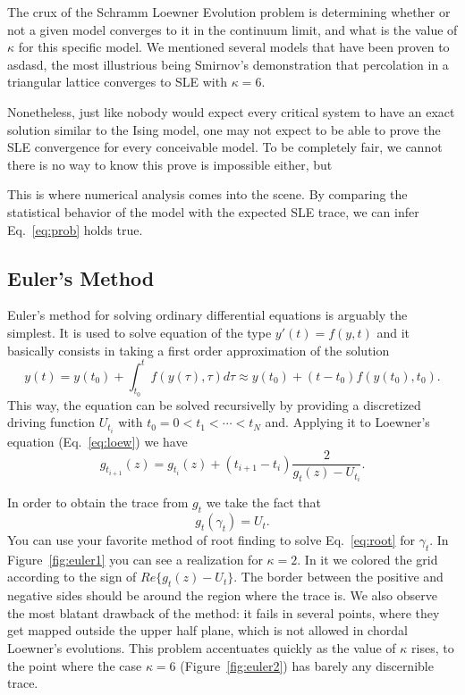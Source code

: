 The crux of the Schramm Loewner Evolution problem is determining whether or not
a given model converges to it in the continuum limit, and what is the value of
$\kappa$ for this specific model. We mentioned several models that have been
proven to asdasd, the most illustrious being Smirnov's demonstration that
percolation in a triangular lattice converges to SLE with $\kappa=6$.

Nonetheless, just like nobody would expect every critical system to have an
exact solution similar to the Ising model, one may not expect to be able to
prove the SLE convergence for every conceivable model. To be completely
fair, we cannot there is no way to know this prove is impossible either, but

This is where
numerical analysis comes into the scene. By comparing the statistical behavior
of the model with the expected SLE trace, we can infer Eq.~\ref{eq:prob} holds
true.

\subsection{Euler's Method}
\label{ss:euler}

Euler's method for solving ordinary differential equations is arguably the
simplest. It is used to solve equation of the type $y'(t) = f(y, t)$ and it
basically consists in taking a first order approximation of the solution
\begin{equation}
    \newcommand{\y}[1]{y\left(#1\right)}
    \newcommand{\f}[1]{f\left(#1\right)}
    \y{t} = \y{t_0} + \int_{t_0}^t \f{\y{\tau}, \tau} d\tau \approx
            \y{t_0} + \left(t - t_0\right)\f{\y{t_0}, t_0}.
\end{equation}
This way, the equation can be solved recursivelly by providing a discretized
driving function $U_{t_i}$ with $t_0 = 0 < t_{1}<\cdots<t_N$ and. Applying it
to Loewner's equation (Eq.~\ref{eq:loew}) we have
\begin{equation}
    g_{t_{i+1}}(z) = g_{t_i}(z) + (t_{i+1} - t_i) \frac{2}{g_t(z) - U_{t_i}}.
\end{equation}

In order to obtain the trace from $g_t$ we take the fact that
\begin{equation}
    g_t(\gamma_t) = U_t.
    \label{eq:root}
\end{equation}
You can use your favorite method of root finding to solve Eq.~\ref{eq:root} for
$\gamma_t$. In Figure~\ref{fig:euler1} you can see a realization for
$\kappa=2$. In it we colored the grid according to the sign of
$Re\{g_t(z)-U_t\}$. The border between the positive and negative sides should
be around the region where the trace is. We also observe the most blatant
drawback of the method: it fails in several points, where they get mapped
outside the upper half plane, which is not allowed in chordal Loewner's
evolutions. This problem accentuates quickly as the value of $\kappa$ rises,
to the point where the case $\kappa=6$ (Figure~\ref{fig:euler2}) has barely
any discernible trace.

